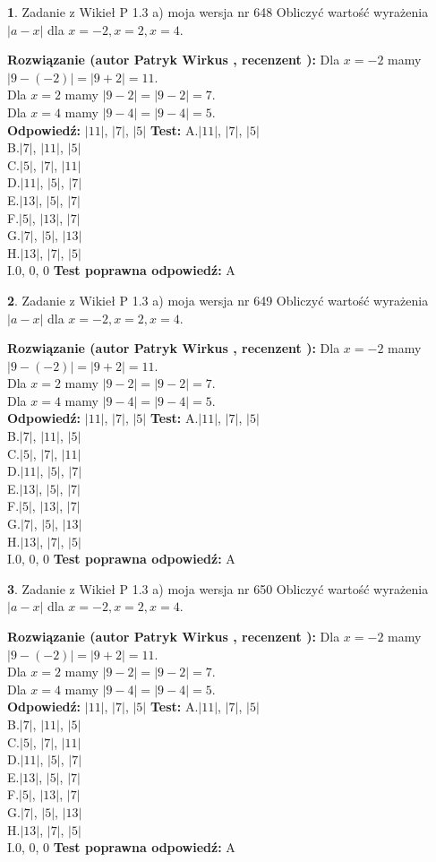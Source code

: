 \documentclass[12pt, a4paper]{article}
\theoremstyle{definition} %
\newtheorem{zad}{}
\newcommand{\zadStart}[1]{\begin{zad}#1\newline}
\newcommand{\zadStop}{\end{zad}}
\newcommand{\rozwStart}[2]{\noindent \textbf{Rozwiązanie (autor #1 , recenzent #2): }\newline}
\newcommand{\rozwStop}{\newline}
\newcommand{\odpStart}{\noindent \textbf{Odpowiedź:}\newline}
\newcommand{\odpStop}{\newline}
\newcommand{\testStart}{\noindent \textbf{Test:}\newline}
\newcommand{\testStop}{\newline}
\newcommand{\kluczStart}{\noindent \textbf{Test poprawna odpowiedź:}\newline}
\newcommand{\kluczStop}{\newline}
\begin{document}
\zadStart{Zadanie z Wikieł P 1.3 a) moja wersja nr 648}
Obliczyć wartość wyrażenia $|a - x|$ dla $x=-2,x=2,x=4$.
\zadStop
\rozwStart{Patryk Wirkus}{}
Dla $x = -2$ mamy $|9 - (-2)| = |9 + 2| = 11$.\\
Dla $x = 2$ mamy $|9 - 2| = |9 - 2| = 7$.\\
Dla $x = 4$ mamy $|9 - 4| = |9 - 4| = 5$.\\
\rozwStop
\odpStart
$|11|$, $|7|$, $|5|$
\odpStop
\testStart
A.$|11|$, $|7|$, $|5|$\\
B.$|7|$, $|11|$, $|5|$\\
C.$|5|$, $|7|$, $|11|$\\
D.$|11|$, $|5|$, $|7|$\\
E.$|13|$, $|5|$, $|7|$\\
F.$|5|$, $|13|$, $|7|$\\
G.$|7|$, $|5|$, $|13|$\\
H.$|13|$, $|7|$, $|5|$\\
I.$0$, $0$, $0$
\testStop
\kluczStart
A
\kluczStop



\zadStart{Zadanie z Wikieł P 1.3 a) moja wersja nr 649}
Obliczyć wartość wyrażenia $|a - x|$ dla $x=-2,x=2,x=4$.
\zadStop
\rozwStart{Patryk Wirkus}{}
Dla $x = -2$ mamy $|9 - (-2)| = |9 + 2| = 11$.\\
Dla $x = 2$ mamy $|9 - 2| = |9 - 2| = 7$.\\
Dla $x = 4$ mamy $|9 - 4| = |9 - 4| = 5$.\\
\rozwStop
\odpStart
$|11|$, $|7|$, $|5|$
\odpStop
\testStart
A.$|11|$, $|7|$, $|5|$\\
B.$|7|$, $|11|$, $|5|$\\
C.$|5|$, $|7|$, $|11|$\\
D.$|11|$, $|5|$, $|7|$\\
E.$|13|$, $|5|$, $|7|$\\
F.$|5|$, $|13|$, $|7|$\\
G.$|7|$, $|5|$, $|13|$\\
H.$|13|$, $|7|$, $|5|$\\
I.$0$, $0$, $0$
\testStop
\kluczStart
A
\kluczStop



\zadStart{Zadanie z Wikieł P 1.3 a) moja wersja nr 650}
Obliczyć wartość wyrażenia $|a - x|$ dla $x=-2,x=2,x=4$.
\zadStop
\rozwStart{Patryk Wirkus}{}
Dla $x = -2$ mamy $|9 - (-2)| = |9 + 2| = 11$.\\
Dla $x = 2$ mamy $|9 - 2| = |9 - 2| = 7$.\\
Dla $x = 4$ mamy $|9 - 4| = |9 - 4| = 5$.\\
\rozwStop
\odpStart
$|11|$, $|7|$, $|5|$
\odpStop
\testStart
A.$|11|$, $|7|$, $|5|$\\
B.$|7|$, $|11|$, $|5|$\\
C.$|5|$, $|7|$, $|11|$\\
D.$|11|$, $|5|$, $|7|$\\
E.$|13|$, $|5|$, $|7|$\\
F.$|5|$, $|13|$, $|7|$\\
G.$|7|$, $|5|$, $|13|$\\
H.$|13|$, $|7|$, $|5|$\\
I.$0$, $0$, $0$
\testStop
\kluczStart
A
\kluczStop
\end{document}
